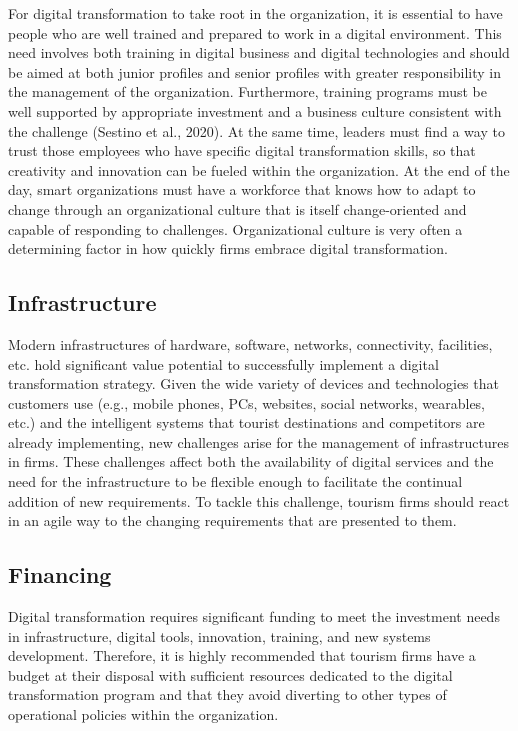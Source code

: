 \documentclass[
  letterpaper,
  DIV=11,
  numbers=noendperiod]{scrreprt}
\begin{document}
For digital transformation to take root in the organization, it is
essential to have people who are well trained and prepared to work in a
digital environment. This need involves both training in digital
business and digital technologies and should be aimed at both junior
profiles and senior profiles with greater responsibility in the
management of the organization. Furthermore, training programs must be
well supported by appropriate investment and a business culture
consistent with the challenge (Sestino et al., 2020). At the same time,
leaders must find a way to trust those employees who have specific
digital transformation skills, so that creativity and innovation can be
fueled within the organization. At the end of the day, smart
organizations must have a workforce that knows how to adapt to change
through an organizational culture that is itself change-oriented and
capable of responding to challenges. Organizational culture is very
often a determining factor in how quickly firms embrace digital
transformation.

\hypertarget{infrastructure}{%
\subsection{Infrastructure}\label{infrastructure}}

Modern infrastructures of hardware, software, networks, connectivity,
facilities, etc. hold significant value potential to successfully
implement a digital transformation strategy. Given the wide variety of
devices and technologies that customers use (e.g., mobile phones, PCs,
websites, social networks, wearables, etc.) and the intelligent systems
that tourist destinations and competitors are already implementing, new
challenges arise for the management of infrastructures in firms. These
challenges affect both the availability of digital services and the need
for the infrastructure to be flexible enough to facilitate the continual
addition of new requirements. To tackle this challenge, tourism firms
should react in an agile way to the changing requirements that are
presented to them.

\hypertarget{financing}{%
\subsection{Financing}\label{financing}}

Digital transformation requires significant funding to meet the
investment needs in infrastructure, digital tools, innovation, training,
and new systems development. Therefore, it is highly recommended that
tourism firms have a budget at their disposal with sufficient resources
dedicated to the digital transformation program and that they avoid
diverting to other types of operational policies within the
organization.
\end{document}
